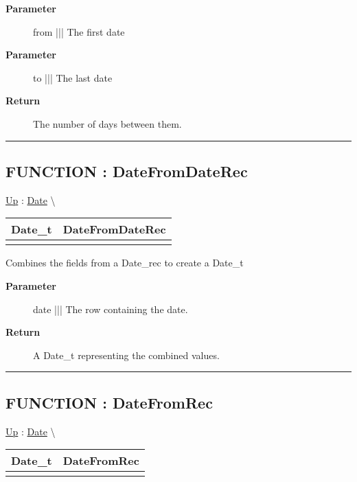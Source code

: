 \par
\begin{description}
\item [\textbf{Parameter}] from ||| The first date
\item [\textbf{Parameter}] to ||| The last date
\item [\textbf{Return}] The number of days between them.
\end{description}

\rule{\linewidth}{0.5pt}
\subsection*{FUNCTION : DateFromDateRec}
\hypertarget{ecldoc:date.datefromdaterec}{}
\hyperlink{ecldoc:Date}{Up} :
\hspace{0pt} \hyperlink{ecldoc:Date}{Date} \textbackslash 

{\renewcommand{\arraystretch}{1.5}
\begin{tabularx}{\textwidth}{|>{\raggedright\arraybackslash}l|X|}
\hline
\hspace{0pt}Date\_t & DateFromDateRec \\
\hline
\multicolumn{2}{|>{\raggedright\arraybackslash}X|}{\hspace{0pt}(Date\_rec date)} \\
\hline
\end{tabularx}
}

\par
Combines the fields from a Date\_rec to create a Date\_t

\par
\begin{description}
\item [\textbf{Parameter}] date ||| The row containing the date.
\item [\textbf{Return}] A Date\_t representing the combined values.
\end{description}

\rule{\linewidth}{0.5pt}
\subsection*{FUNCTION : DateFromRec}
\hypertarget{ecldoc:date.datefromrec}{}
\hyperlink{ecldoc:Date}{Up} :
\hspace{0pt} \hyperlink{ecldoc:Date}{Date} \textbackslash 

{\renewcommand{\arraystretch}{1.5}
\begin{tabularx}{\textwidth}{|>{\raggedright\arraybackslash}l|X|}
\hline
\hspace{0pt}Date\_t & DateFromRec \\
\hline
\multicolumn{2}{|>{\raggedright\arraybackslash}X|}{\hspace{0pt}(Date\_rec date)} \\
\hline
\end{tabularx}
}

